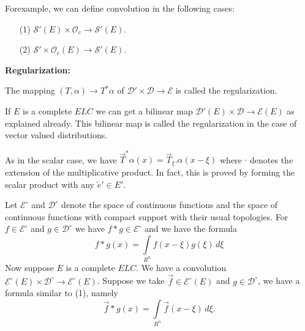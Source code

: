 For\pageoriginale example, we can define convolution in the following cases:
\begin{itemize}
\item [(1)] $\mathscr{S}'(E)\times \mathscr{O}_c \to \mathscr{S}'
  (E)$.
\item [(2)] $\mathscr{S}'\times \mathscr{O}_c (E) \to \mathscr{S}' (E)$.
\end{itemize}

\noindent
{\bf Regularization:}
\medskip

\begin{definition}\label{chap7:def7.2}
The mapping $(T, \alpha) \to T^\ast \alpha$ of $\mathscr{D}'\times
\mathscr{D} \to \mathscr{E}$ is called the regularization.

If $E$ is a complete $E L C$ we can get a bilinear map $\mathscr{D}'
(E)\times \mathscr{D} \to \mathscr{E} (E)$ as explained already. This
bilinear map is called the regularization in the case of vector valued
distributions. 

As in the scalar case, we have $\overrightarrow{T}^\ast \alpha (x)=
\overrightarrow{T}_{\xi}. \alpha (x-\xi)$ where $\cdot$ denotes the extension
of the multiplicative product. In fact, this is proved by forming the
scalar product with any $\overleftarrow{e}' \in E'$.

Let $\mathscr{E}^\circ$ and $\mathscr{D}^\circ$ denote the space of
continuous functions and the space of continuous functions with
compact support with their usual topologies. For $f \in
\mathscr{E}^\circ$ and $g \in \mathscr{D}^\circ$ we have $f\ast g\in
\mathscr{E}^\circ$ and we have the formula
\begin{equation}
f \ast g (x) = \int\limits_{R^n} 
f(x - \xi) g(\xi)\,d\xi \tag{1}
\end{equation}
Now suppose $E$ is a complete $E L C$. We have a convolution
$\mathscr{E}^\circ (E)\times \mathscr{D}^\circ \to
\mathscr{E}^\circ(E)$. Suppose we take $\overrightarrow{f} \in
\mathscr{E}^\circ (E)$ and $g \in \mathscr{D}^\circ$, we have a
formula similar to (1), namely
$$
\overrightarrow{f} \ast g (x) = \int\limits_{R^n}
\overrightarrow{f}(x-\xi)\,d\xi.
$$
\end{definition}

